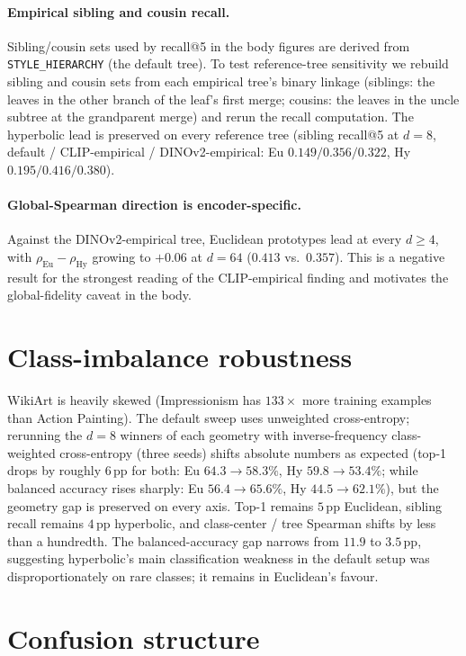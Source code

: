 \paragraph{Empirical sibling and cousin recall.} Sibling/cousin sets
used by recall@5 in the body figures are derived from
\texttt{STYLE\_HIERARCHY} (the default tree). To test reference-tree
sensitivity we rebuild sibling and cousin sets from each empirical
tree's binary linkage (siblings: the leaves in the other branch of
the leaf's first merge; cousins: the leaves in the uncle subtree at
the grandparent merge) and rerun the recall computation. The hyperbolic lead is preserved on every reference
tree (sibling recall@5 at $d{=}8$, default / CLIP-empirical /
DINOv2-empirical: Eu $0.149 / 0.356 / 0.322$, Hy $0.195 / 0.416 /
0.380$).

\paragraph{Global-Spearman direction is encoder-specific.} Against
the DINOv2-empirical tree, Euclidean prototypes lead at every
$d \geq 4$, with $\rho_{\textrm{Eu}} - \rho_{\textrm{Hy}}$ growing to
$+0.06$ at $d{=}64$ ($0.413$ vs.\ $0.357$). This is a negative result
for the strongest reading of the CLIP-empirical finding and
motivates the global-fidelity caveat in the body.

\section{Class-imbalance robustness}
\label{app:imbalance}

WikiArt is heavily skewed (Impressionism has $133\times$ more
training examples than Action Painting). The default sweep uses
unweighted cross-entropy; rerunning the $d{=}8$ winners of each
geometry with inverse-frequency class-weighted cross-entropy (three
seeds) shifts absolute numbers as expected (top-1 drops by roughly
$6$\,pp for both: Eu $64.3 \to 58.3\%$, Hy $59.8 \to 53.4\%$; while
balanced accuracy rises sharply: Eu $56.4 \to 65.6\%$, Hy
$44.5 \to 62.1\%$), but the geometry gap is preserved on every axis. Top-1 remains $5$\,pp Euclidean, sibling recall remains
$4$\,pp hyperbolic, and class-center / tree Spearman shifts by less
than a hundredth. The balanced-accuracy gap narrows from $11.9$ to
$3.5$\,pp, suggesting hyperbolic's main classification weakness in
the default setup was disproportionately on rare classes; it remains
in Euclidean's favour.

\section{Confusion structure}
\label{app:confusion}

